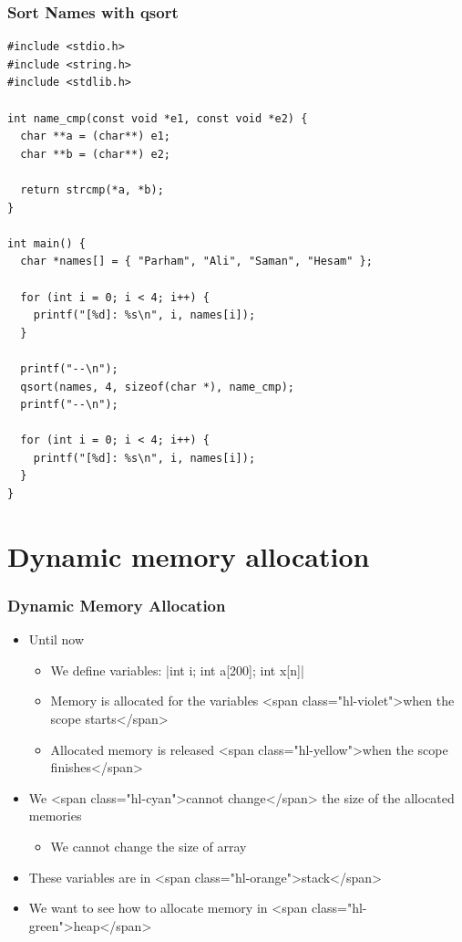 \documentclass{../c-lecture}
\begin{document}
\begin{frame}[fragile]
  \frametitle{Sort Names with qsort}
  \begin{verbatim}
#include <stdio.h>
#include <string.h>
#include <stdlib.h>

int name_cmp(const void *e1, const void *e2) {
  char **a = (char**) e1;
  char **b = (char**) e2;

  return strcmp(*a, *b);
}

int main() {
  char *names[] = { "Parham", "Ali", "Saman", "Hesam" };

  for (int i = 0; i < 4; i++) {
    printf("[%d]: %s\n", i, names[i]);
  }

  printf("--\n");
  qsort(names, 4, sizeof(char *), name_cmp);
  printf("--\n");

  for (int i = 0; i < 4; i++) {
    printf("[%d]: %s\n", i, names[i]);
  }
}
  \end{verbatim}
\end{frame}

\section{Dynamic memory allocation}

\begin{frame}
  \frametitle{Dynamic Memory Allocation}
  \begin{itemize}
    \item Until now
    \begin{itemize}
      \item
        We define variables:
        |int i; int a[200]; int x[n]|

      \item
        Memory is allocated for the variables
        <span class="hl-violet">when the scope starts</span>

      \item
        Allocated memory is released
        <span class="hl-yellow">when the scope finishes</span>

    \end{itemize}
    \item
      We <span class="hl-cyan">cannot change</span> the size of the allocated
      memories

    \begin{itemize}
      \item We cannot change the size of array
    \end{itemize}
    \item These variables are in <span class="hl-orange">stack</span>
    \item
      We want to see how to allocate memory in
      <span class="hl-green">heap</span>

  \end{itemize}
\end{frame}
\end{document}
